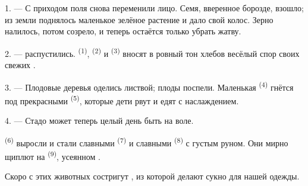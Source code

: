 %


\VUsaut{5.0mm}
\VUsaut{3.0mm}
\VUsaut{3.0mm}
\VUsaut{4.0mm}
\VUsaut{3.0mm}

1. --- С приходом  поля снова переменили лицо. Семя, вверенное
борозде, взошло; из земли поднялось маленькое зелёное растение и дало
свой колос. Зерно налилось, потом созрело, и теперь остаётся только
убрать жатву.

2. ---  распустились. 
\textsuperscript{(1)},  \textsuperscript{(2)} и 
\textsuperscript{(3)} вносят в ровный тон хлебов весёлый спор своих свежих
.

3. --- Плодовые деревья оделись листвой; плоды поспели. Маленькая
 \textsuperscript{(4)} гнётся под прекрасными 
\textsuperscript{(5)}, которые дети рвут и едят с наслаждением.

4. --- Стадо может теперь целый день быть на воле.

 \textsuperscript{(6)} выросли и стали славными 
\textsuperscript{(7)} и славными  \textsuperscript{(8)} с густым
руном. Они мирно щиплют  на 
\textsuperscript{(9)}, усеянном .

Скоро с этих животных состригут , из которой делают сукно
для нашей одежды.

\VUsaut{5.0mm}
\VUsaut{3.4mm}

